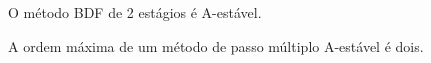 \begin{teo}
O método BDF de 2 estágios é A-estável.
\end{teo}

\begin{teo}
 A ordem máxima de um método de passo múltiplo A-estável é dois.
\end{teo}


%
%
%


